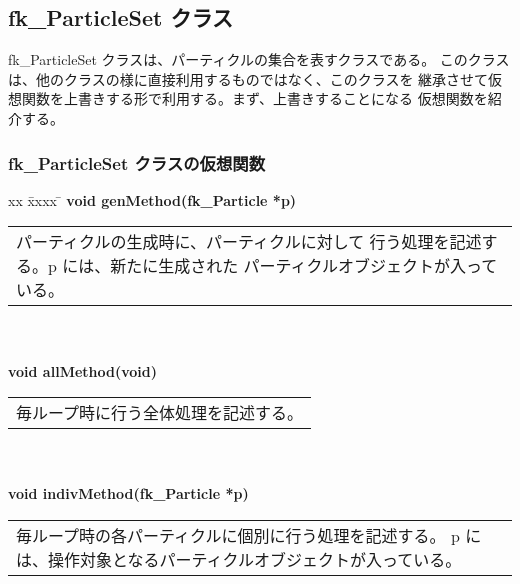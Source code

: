 \subsection{fk\_ParticleSet クラス} 
fk\_ParticleSet クラスは、パーティクルの集合を表すクラスである。
このクラスは、他のクラスの様に直接利用するものではなく、このクラスを
継承させて仮想関数を上書きする形で利用する。まず、上書きすることになる
仮想関数を紹介する。
\subsubsection{fk\_ParticleSet クラスの仮想関数}
\begin{tabbing}
xx \= xxxx \= \kill
\> \textbf{void genMethod(fk\_Particle *p)} \\
	\> \> \begin{tabular}{p{15cm}}
		パーティクルの生成時に、パーティクルに対して
		行う処理を記述する。p には、新たに生成された
		パーティクルオブジェクトが入っている。
	\end{tabular} \\ \\

\> \textbf{void allMethod(void)} \\
	\> \> \begin{tabular}{p{15cm}}
		毎ループ時に行う全体処理を記述する。
	\end{tabular} \\ \\

\> \textbf{void indivMethod(fk\_Particle *p)} \\
	\> \> \begin{tabular}{p{15cm}}
		毎ループ時の各パーティクルに個別に行う処理を記述する。
		p には、操作対象となるパーティクルオブジェクトが入っている。
	\end{tabular}
\end{tabbing}
